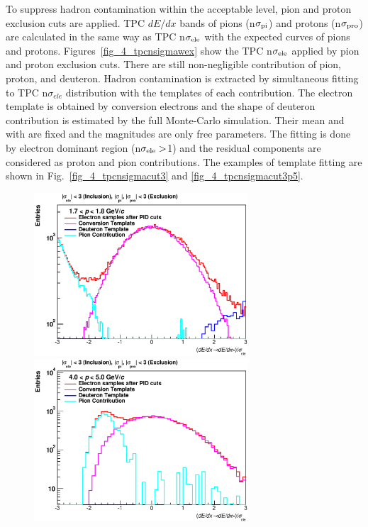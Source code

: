 {To suppress hadron contamination within the acceptable level, pion and proton exclusion cuts are applied. 
TPC $dE/dx$ bands of pions (n$\sigma_{\rm{pi}}$) and protons (n$\sigma_{\rm{pro}}$) are calculated in the same way as TPC n$\sigma_{\rm{ele}}$ with the expected curves of pions and protons.
Figures~\ref{fig_4_tpcnsigmawex} show the TPC n$\sigma_{\rm{ele}}$ applied by pion and proton exclusion cuts. 
There are still non-negligible contribution of pion, proton, and deuteron. 
Hadron contamination is extracted by simultaneous fitting to TPC n$\sigma_{ele}$ distribution with the templates of each contribution. 
The electron template is obtained by conversion electrons and the shape of deuteron contribution is estimated by the full Monte-Carlo simulation. 
Their mean and with are fixed and the magnitudes are only free parameters. 
The fitting is done by electron dominant region (n$\sigma_{\rm{ele}}>$1) and the residual components are considered as proton and pion contributions. 
The examples of template fitting are shown in  Fig.~\ref{fig_4_tpcnsigmacut3} and \ref{fig_4_tpcnsigmacut3p5}. 
\begin{figure}[!h]
 \begin{minipage}{0.5\hsize}
  \begin{center}
 	\includegraphics[width=8cm]{chap4/figure/PID/TPCNSigma_AfterExclusion3_MB_1p7_1p8.eps}
  \end{center}
 \end{minipage}
 \begin{minipage}{0.5\hsize}
  \begin{center}
	 \includegraphics[width=8cm]{chap4/figure/PID/TPCNSigma_AfterExclusion3_MB_4_5.eps}

\end{center}
\end{minipage}
\end{figure}}
